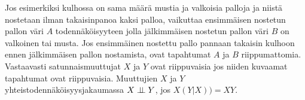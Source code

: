 Jos esimerkiksi  kulhossa on sama määrä mustia ja valkoisia palloja ja niistä nostetaan ilman takaisinpanoa kaksi palloa, vaikuttaa ensimmäisen nostetun pallon väri $A$ todennäköisyyteen jolla jälkimmäisen nostetun pallon väri $B$ on valkoinen tai musta. Jos ensimmäinen nostettu pallo pannaan takaisin kulhoon ennen jälkimmäisen pallon nostamista, ovat tapahtumat $A$ ja $B$ riippumattomia. Vastaavasti satunnaismuuttujat $X$ ja $Y$ ovat riippuvaisia jos niiden kuvaamat tapahtumat ovat riippuvaisia. Muuttujien $X$ ja $Y$ yhteistodennäköisyysjakaumassa $X \perp \!\!\! \perp Y$, jos $X(Y|X) ) = XY$.


 

